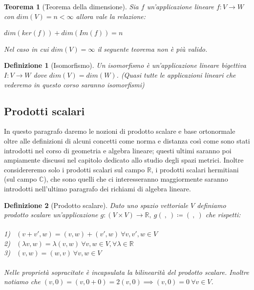 \documentclass[a4paper,12pt]{report}
\newtheorem{teorema}{Teorema}[chapter]
\newtheorem{definizione}{Definizione}[chapter]
\begin{document}
\begin{teorema}[Teorema della dimensione]
    Sia $f$ un'applicazione lineare $f:V \to W$ con $dim(V)=n <\infty$ allora vale la relazione:
      \begin{center}
        $dim(ker(f))+dim(Im(f))=n$
        \end{center}
    Nel caso in cui $dim(V)= \infty$ il seguente teorema non è più valido.
\end{teorema}

\begin{definizione}[Isomorfismo]
    Un isomorfismo è un'applicazione lineare bigettiva \\ $I:V \to W$ dove $dim(V)=dim(W)$. (Quasi tutte le applicazioni lineari che vederemo in questo corso saranno isomorfismi)
\end{definizione}
    
\subsection{Prodotti scalari}

In questo paragrafo daremo le nozioni di prodotto scalare e base ortonormale oltre alle definizioni di alcuni concetti come norma e distanza così come sono stati introdotti nel corso di geometria e algebra lineare; questi ultimi saranno poi ampiamente discussi nel capitolo dedicato allo studio degli spazi metrici. Inoltre considereremo solo i prodotti scalari sul campo $\mathbb{R}$, i prodotti scalari hermitiani (sul campo $\mathbb{C}$), che sono quelli che ci interesseranno maggiormente saranno introdotti nell'ultimo paragrafo dei richiami di algebra lineare.

\begin{definizione}[Prodotto scalare]
    Dato uno spazio vettoriale $V$ definiamo prodotto scalare un'applicazione $g:(V \times V) \to \mathbb{R}, \ g( \ , \ ) \coloneqq( \ , \ )$ che rispetti:
\\
    \\1) \ $(v+v',w)=(v,w)+(v',w) \ \forall v,v',w \in V$
    \\2) \ $(\lambda v, w)=\lambda(v,w) \ \forall v,w \in V,\forall\lambda \in \mathbb{R}$
    \\3) \ $(v,w)=(w,v) \ \forall v,w \in V$
\\
    \\Nelle proprietà sopracitate è incapsulata la bilinearità del prodotto scalare. Inoltre notiamo che $(v,0)=(v,0+0)=2(v,0) \implies(v,0)=0 \ \forall v\in V$.
\end{definizione}
\end{document}
